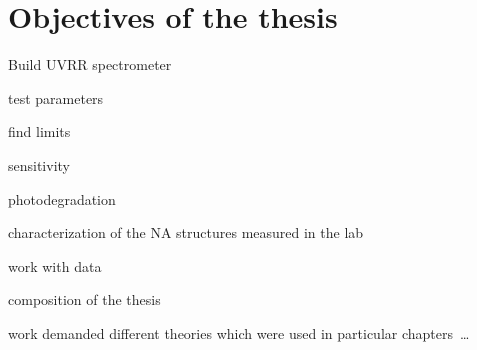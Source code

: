 \chapter{Objectives of the thesis}

\begin{docitemize}
	\item Build UVRR spectrometer
	\item test parameters
	\item find limits
	\item sensitivity
	\item photodegradation
	\item characterization of the NA structures measured in the lab
	\item work with data
	\item composition of the thesis
	\item work demanded different theories which were used in particular
		chapters~\ldots
\end{docitemize}
